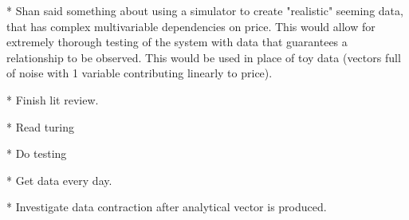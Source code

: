 * Shan said something about using a simulator to create "realistic" seeming data, that has complex multivariable dependencies on price. This would allow for extremely thorough testing of the system with data that guarantees a relationship to be observed. This would be used in place of toy data (vectors full of noise with 1 variable contributing linearly to price).

* Finish lit review.

* Read turing

* Do testing

* Get data every day.

* Investigate data contraction after analytical vector is produced.